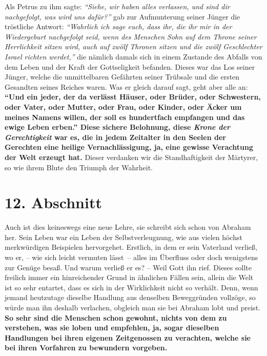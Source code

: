 Als Petrus zu ihm sagte:
\textit{"`Siehe, wir haben alles verlassen, und sind dir
nachgefolgt, was wird uns dafür?"'}
gab zur Aufmunterung seiner Jünger die tröstliche Antwort:
\textit{"`Wahrlich ich sage euch, dass ihr, die ihr mir in der
Wiedergeburt nachgefolgt seid, wenn des Menschen Sohn auf dem Throne seiner
Herrlichkeit sitzen wird, auch auf zwölf Thronen sitzen und die zwölf
Geschlechter Israel richten werdet,"'}
die nämlich
damals sich in einem Zustande des Abfalls von dem Leben und der Kraft der
Gottseligkeit befanden. Dieses war das Los seiner Jünger, welche die
unmittelbaren Gefährten seiner Trübsale und die ersten Gesandten seines
Reiches waren. Was er gleich darauf sagt, geht aber alle an:
\textbf{ "`Und ein
jeder, der da verlässt Häuser, oder Brüder, oder Schwestern, oder Vater, oder
Mutter, oder Frau, oder Kinder, oder Äcker um meines Namens willen, der
soll es hundertfach empfangen und das ewige Leben erben."'
Diese sichere Belohnung, diese
\textit{Krone der Gerechtigkeit}
war es, die in jedem Zeitalter in den Seelen der Gerechten
eine heilige Vernachlässigung, ja, eine gewisse Verachtung der Welt erzeugt
hat.} Dieser verdanken wir die Standhaftigkeit der Märtyrer,
so wie ihrem
Blute den Triumph der Wahrheit.
\label{ref:04_10_pilger_ende}

\section{12. Abschnitt} \label{kap4_ab12}

Auch ist dies keineswegs eine neue Lehre, sie schreibt sich schon von
Abraham her. Sein Leben war ein Leben der
Selbstverleugnung, wie aus vielen
höchst merkwürdigen Beispielen hervorgehet. Erstlich, in dem er sein Vaterland
verließ, wo er, -- wie sich leicht vermuten lässt~-- alles im Überfluss oder
doch wenigstens zur Genüge besaß. Und warum verließ er es? -- Weil Gott ihn
rief. Dieses sollte freilich immer ein hinreichender Grund in ähnlichen Fällen
sein, allein die Welt ist so sehr entartet, dass es sich in der Wirklichkeit
nicht so verhält. Denn, wenn jemand heutzutage dieselbe Handlung aus denselben
Beweggründen vollzöge, so würde man ihn deshalb verlachen, obgleich man sie bei
Abraham lobt und preist.
\label{ref:04_12_tugend}
\textbf{So sehr sind die Menschen schon gewohnt, nichts von
dem zu verstehen, was sie loben und empfehlen, ja, sogar dieselben Handlungen
bei ihren eigenen Zeitgenossen zu verachten, welche sie bei ihren Vorfahren zu
bewundern vorgeben.}


